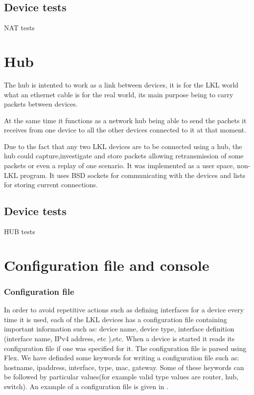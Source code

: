 {{\subsection{Device tests}
\label{sub-sec:nat-tests}
NAT tests

\section{Hub}
\label{sec:hub:impl}

The hub is intented to work as a link between devices, it is for the LKL world what an ethernet cable is for the real world, its main purpose being to carry packets between devices.

At the same time it functions as a network hub being able to send the pachets it receives from one device to all the other devices connected to it at that moment.

Due to the fact that any two LKL devices are to be connected using a hub, the hub could capture,investigate and store packets allowing retransmission of some packets or even a replay of one scenario.  
It was implemented as a user space, non-LKL program. It uses BSD sockets for communicating with the devices and lists for storing current connections.
\subsection{Device tests}
\label{sub-sec:router-tests}
HUB tests

\section{Configuration file and console}
\label{sec:config}

\subsubsection{Configuration file}
\label{subsec:config-file}
In order to avoid repetitive actions such as defining interfaces for a device every time it is used, each of the LKL devices has a configuration file containing important information such as: device name, device type, interface definition (interface name, IPv4 address, etc ),etc. When a device is started it reads its configuration file if one was specified for it. The configuration file is parsed using Flex. We have definded some keywords for writing a configuration file such as: hostname, ipaddress, interface, type, mac, gateway. Some of these heywords can be followed by particular values(for example valid type values are router, hub, switch). An example of a configuration file is given in .

}}
